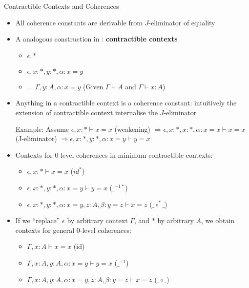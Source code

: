 \documentclass[12pt, mathserif,handout]{beamer}
\begin{document}
\begin{frame}[allowframebreaks,t]{Contractible Contexts and Coherences}

\begin{itemize}

\item All coherence constants are derivable from $J$-eliminator of
  equality

\item A analogous construction in \tig: \textbf{contractible contexts}
\begin{itemize}
\item $\epsilon, * $
\item $\epsilon,x : *, y : *, \alpha : x = y$
\item ... $\Gamma, y: A , \alpha : x = y$ (Given $\Gamma \vdash A$ and
  $\Gamma \vdash x : A$)
\end{itemize}

\item Anything in a contractible context is a coherence constant:
  intuitively the extension of contractible context internalise the
  $J$-eliminator

Example: Assume $\epsilon,x : * \vdash x = x$ (weakening)
$\Rightarrow \epsilon,x : *, x : *, \alpha : x = x \vdash x =
x$ (J-eliminator)
$\Rightarrow \epsilon,x : *, y : *, \alpha : x = y \vdash y = x$


\item Contexts for 0-level coherences in minimum contractible contexts:
\begin{itemize}
\item $\epsilon,x : * \vdash x = x$ ($id^{*}$)
\item $\epsilon,x : *, y : *, \alpha : x = y \vdash y = x$ ($\_^{-1*}$)
\item $\epsilon,x : *, y : *, \alpha : x = y, z: A,
  \beta : y = z \vdash x = z$ ($\_\circ^{*}\_$)
\end{itemize}

\item If we ``replace'' $\epsilon$ by arbitrary context $\Gamma$, and
  $*$ by arbitrary $A$, we obtain contexts for general 0-level coherences:
\begin{itemize}
\item $\Gamma,x : A \vdash x = x$ (id)
\item $\Gamma,x : A, y : A, \alpha : x = y \vdash y = x$ ($\_^{-1}$)
\item $\Gamma,x : A, y : A, \alpha : x = y, z: A,
  \beta : y = z \vdash x = z$ ($\_\circ\_$)
\end{itemize}


\end{itemize}
\end{frame}
\end{document}
